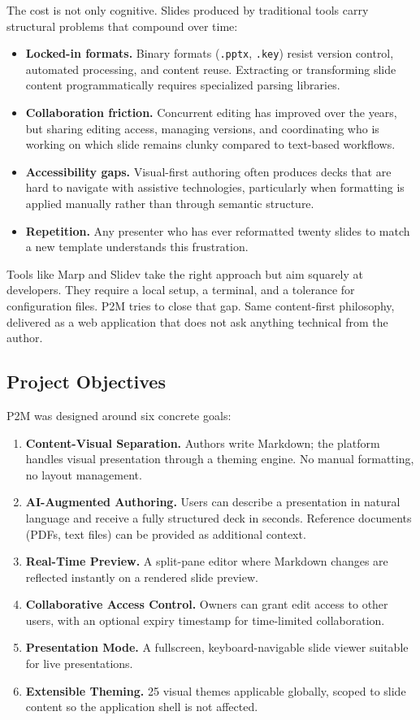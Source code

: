 \documentclass[10pt,a4paper]{article}
\begin{document}
The cost is not only cognitive. Slides produced by traditional tools carry structural problems that compound over time:

\begin{itemize}[noitemsep, topsep=4pt]
  \item \textbf{Locked-in formats.} Binary formats (\texttt{.pptx}, \texttt{.key}) resist version control, automated processing, and content reuse. Extracting or transforming slide content programmatically requires specialized parsing libraries.
  \item \textbf{Collaboration friction.} Concurrent editing has improved over the years, but sharing editing access, managing versions, and coordinating who is working on which slide remains clunky compared to text-based workflows.
  \item \textbf{Accessibility gaps.} Visual-first authoring often produces decks that are hard to navigate with assistive technologies, particularly when formatting is applied manually rather than through semantic structure.
  \item \textbf{Repetition.} Any presenter who has ever reformatted twenty slides to match a new template understands this frustration.
\end{itemize}

Tools like Marp and Slidev take the right approach but aim squarely at developers. They require a local setup, a terminal, and a tolerance for configuration files. P2M tries to close that gap. Same content-first philosophy, delivered as a web application that does not ask anything technical from the author.

\subsection{Project Objectives}

P2M was designed around six concrete goals:

\begin{enumerate}[noitemsep, topsep=4pt]
  \item \textbf{Content-Visual Separation.} Authors write Markdown; the platform handles visual presentation through a theming engine. No manual formatting, no layout management.
  \item \textbf{AI-Augmented Authoring.} Users can describe a presentation in natural language and receive a fully structured deck in seconds. Reference documents (PDFs, text files) can be provided as additional context.
  \item \textbf{Real-Time Preview.} A split-pane editor where Markdown changes are reflected instantly on a rendered slide preview.
  \item \textbf{Collaborative Access Control.} Owners can grant edit access to other users, with an optional expiry timestamp for time-limited collaboration.
  \item \textbf{Presentation Mode.} A fullscreen, keyboard-navigable slide viewer suitable for live presentations.
  \item \textbf{Extensible Theming.} 25 visual themes applicable globally, scoped to slide content so the application shell is not affected.
\end{enumerate}
\end{document}
